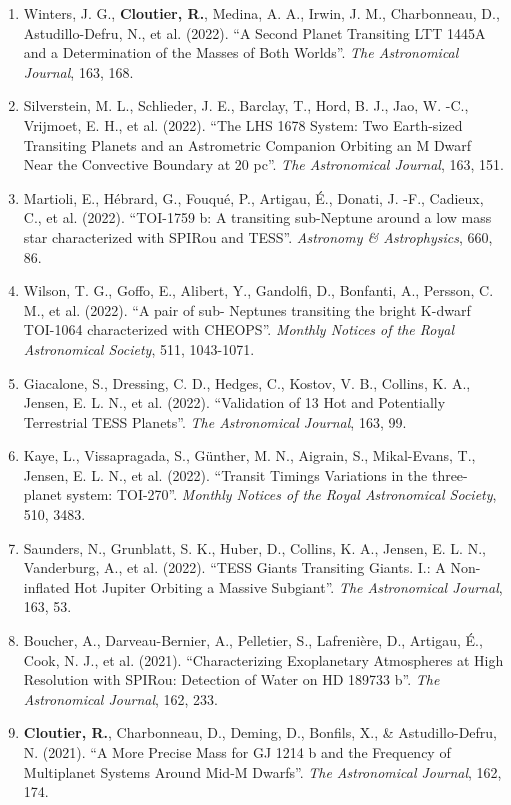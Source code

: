 \documentclass[12pt]{article}
\begin{document}
\begin{itemize}
\begin{enumerate}
\item Winters, J. G., {\bf Cloutier, R.}, Medina, A. A., Irwin, J. M., Charbonneau, D., Astudillo-Defru, N., et al. (2022). ``A Second Planet Transiting LTT 1445A and a Determination of the Masses of Both Worlds''. {\it The Astronomical Journal}, 163, 168. 
\item Silverstein, M. L., Schlieder, J. E., Barclay, T., Hord, B. J., Jao, W. -C., Vrijmoet, E. H., et al. (2022). ``The LHS 1678 System: Two Earth-sized Transiting Planets and an Astrometric Companion Orbiting an M Dwarf Near the Convective Boundary at 20 pc''. {\it The Astronomical Journal}, 163, 151.
\item Martioli, E., Hébrard, G., Fouqué, P., Artigau, É., Donati, J. -F., Cadieux, C., et al. (2022). ``TOI-1759 b: A transiting sub-Neptune around a low mass star characterized with SPIRou and TESS''. {\it Astronomy \& Astrophysics}, 660, 86.
\item Wilson, T. G., Goffo, E., Alibert, Y., Gandolfi, D., Bonfanti, A., Persson, C. M., et al. (2022). ``A pair of sub- Neptunes transiting the bright K-dwarf TOI-1064 characterized with CHEOPS''. {\it Monthly Notices of the Royal Astronomical Society}, 511, 1043-1071.
\item Giacalone, S., Dressing, C. D., Hedges, C., Kostov, V. B., Collins, K. A., Jensen, E. L. N., et al. (2022). ``Validation of 13 Hot and Potentially Terrestrial TESS Planets''. {\it The Astronomical Journal}, 163, 99.
\item Kaye, L., Vissapragada, S., Günther, M. N., Aigrain, S., Mikal-Evans, T., Jensen, E. L. N., et al. (2022). ``Transit Timings Variations in the three-planet system: TOI-270''. {\it Monthly Notices of the Royal Astronomical Society}, 510, 3483.
\item Saunders, N., Grunblatt, S. K., Huber, D., Collins, K. A., Jensen, E. L. N., Vanderburg, A., et al. (2022). ``TESS Giants Transiting Giants. I.: A Non-inflated Hot Jupiter Orbiting a Massive Subgiant''. {\it The Astronomical Journal}, 163, 53.
\item Boucher, A., Darveau-Bernier, A., Pelletier, S., Lafrenière, D., Artigau, É., Cook, N. J., et al. (2021). ``Characterizing Exoplanetary Atmospheres at High Resolution with SPIRou: Detection of Water on HD 189733 b''. {\it The Astronomical Journal}, 162, 233.
\item {\bf Cloutier, R.}, Charbonneau, D., Deming, D., Bonfils, X., \& Astudillo-Defru, N. (2021). ``A More Precise Mass for GJ 1214 b and the Frequency of Multiplanet Systems Around Mid-M Dwarfs''. {\it The Astronomical Journal}, 162, 174.

\end{enumerate}
\end{itemize}
\end{document}
